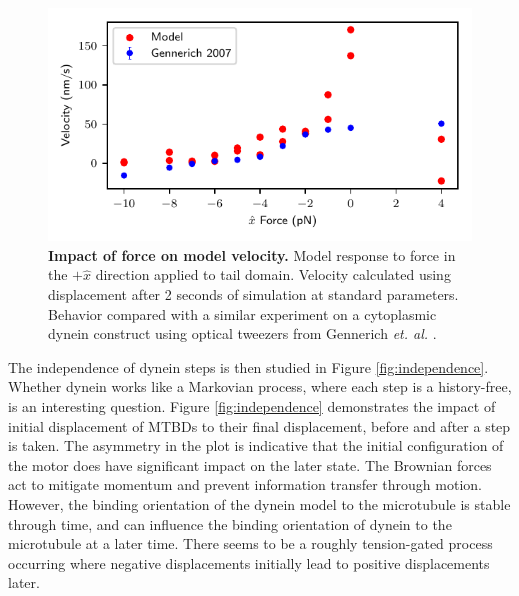 \documentclass[9pt,twocolumn,twoside]{pnas-new}
\begin{document}
\begin{figure}[tbhp]
  \centering
  \includegraphics[width=\linewidth]{../../plots/paper_force_vs_velocity.pdf}
\caption{\textbf{Impact of force on model velocity.} Model response to force in the $+\hat{x}$ direction applied to tail domain. Velocity calculated using displacement after 2 seconds of simulation at standard parameters. Behavior compared with a similar experiment on a cytoplasmic dynein construct using optical tweezers from Gennerich \textit{et. al.} \cite{responsetoload}.}
\label{fig:force}
\end{figure}

The independence of dynein steps is then studied in Figure \ref{fig:independence}. Whether dynein works like a Markovian process, where each step is a history-free, is an interesting question. Figure \ref{fig:independence} demonstrates the impact of initial displacement of MTBDs to their final displacement, before and after a step is taken. The asymmetry in the plot is indicative that the initial configuration of the motor does have significant impact on the later state. The Brownian forces act to mitigate momentum and prevent information transfer through motion. However, the binding orientation of the dynein model to the microtubule is stable through time, and can influence the binding orientation of dynein to the microtubule at a later time. There seems to be a roughly tension-gated process occurring where negative displacements initially lead to positive displacements later.\\
\end{document}
